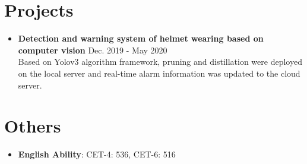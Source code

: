 \documentclass[letterpaper,11pt]{article}
\newcommand{\resumeItems}[2]{
    \item #1 \hfill #2 \\
}
\newcommand{\resumeListStart}{\begin{itemize}[leftmargin=*]}
\newcommand{\resumeListEnd}{\end{itemize}}
\begin{document}
\section{Projects}
    \resumeListStart
        \resumeItems
        {\textbf{Detection and warning system of helmet wearing based on computer vision}}
        {Dec. 2019 - May 2020}
        \vspace*{1mm}
        {Based on Yolov3 algorithm framework, pruning and distillation were deployed on the local server and real-time alarm information was updated to the cloud server.}
    \resumeListEnd


\section{Others}
    \resumeListStart
        \item \textbf{English Ability}{: CET-4: 536, CET-6: 516}
    \resumeListEnd
\end{document}
